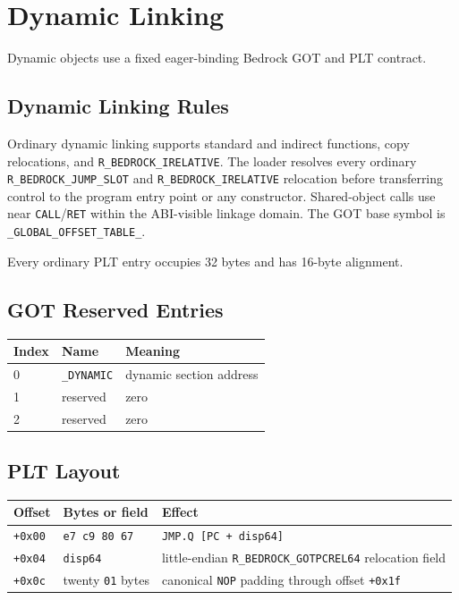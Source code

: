 \documentclass[10pt,twoside]{article}
\begin{document}
\clearpage
\section{Dynamic Linking}\label{page:dynamic-linking}
Dynamic objects use a fixed eager-binding Bedrock GOT and PLT contract.
\subsection{Dynamic Linking Rules}
Ordinary dynamic linking supports standard and indirect functions, copy
relocations, and \texttt{R\_BEDROCK\_IRELATIVE}. The loader resolves every
ordinary \texttt{R\_BEDROCK\_JUMP\_SLOT} and \texttt{R\_BEDROCK\_IRELATIVE}
relocation before transferring control to the program entry point or any
constructor. Shared-object calls use near \texttt{CALL}/\texttt{RET} within
the ABI-visible linkage domain. The GOT base symbol is
\texttt{\_GLOBAL\_OFFSET\_TABLE\_}.

Every ordinary PLT entry occupies 32 bytes and has 16-byte alignment.
\subsection{GOT Reserved Entries}
\begingroup\footnotesize
\setlength{\tabcolsep}{2pt}
\begin{longtable}{@{}p{0.55in}p{1.55in}p{3.4in}@{}}
\toprule
\textbf{Index} & \textbf{Name} & \textbf{Meaning}\\
\midrule
\endhead
0 & \texttt{\_\allowbreak{}DYNAMIC} & dynamic section address\\
1 & reserved & zero\\
2 & reserved & zero\\
\bottomrule
\end{longtable}
\endgroup
\subsection{PLT Layout}
\begingroup\footnotesize
\setlength{\tabcolsep}{2pt}
\begin{longtable}{@{}p{0.75in}p{1.55in}p{3.20in}@{}}
\toprule
\textbf{Offset} & \textbf{Bytes or field} & \textbf{Effect}\\
\midrule
\endhead
\texttt{+0x00} & \texttt{e7 c9 80 67} & \texttt{JMP.Q [PC + disp64]}\\
\texttt{+0x04} & \texttt{disp64} & little-endian \texttt{R\_BEDROCK\_GOTPCREL64} relocation field\\
\texttt{+0x0c} & twenty \texttt{01} bytes & canonical \texttt{NOP} padding through offset \texttt{+0x1f}\\
\bottomrule
\end{longtable}
\endgroup
\end{document}
